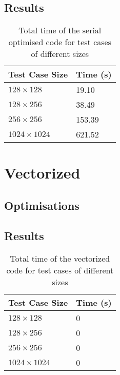 \documentclass[11pt, twocolumn, a4paper]{article}
\begin{document}
\subsection{Results}

\begin{table}[htbp]
    \begin{center}
    \caption{Total time of the serial optimised code for test cases of different sizes}\label{tab:serial_optimised}
    \begin{tabular}{l | l} 
        \hline\hline
        Test Case Size&Time (s)\\
        \hline
        $128 \times 128$&19.10\\
        $128 \times 256$&38.49\\
        $256 \times 256$&153.39\\
        $1024 \times 1024$&621.52\\
        \hline
      \end{tabular}
    \end{center}
\end{table} 

\section{Vectorized}

\subsection{Optimisations}

\subsection{Results}

\begin{table}[htbp]
    \begin{center}
    \caption{Total time of the vectorized code for test cases of different sizes}\label{tab:vectorized}
    \begin{tabular}{l | l} 
        \hline\hline
        Test Case Size&Time (s)\\
        \hline
        $128 \times 128$&0\\
        $128 \times 256$&0\\
        $256 \times 256$&0\\
        $1024 \times 1024$&0\\
        \hline
      \end{tabular}
    \end{center}
\end{table} 
\end{document}

